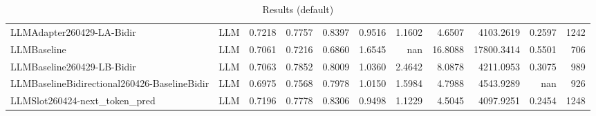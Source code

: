\begin{table}[htbp]
{\begin{tabular}{ll|rrrrrrrr|r}
LLMAdapter260429-LA-Bidir & LLM & 0.7218 & 0.7757 & 0.8397 & 0.9516 & 1.1602 & 4.6507 & 4103.2619 & 0.2597 & 1242 \\
LLMBaseline & LLM & 0.7061 & 0.7216 & 0.6860 & 1.6545 & nan & 16.8088 & 17800.3414 & 0.5501 & 706 \\
LLMBaseline260429-LB-Bidir & LLM & 0.7063 & 0.7852 & 0.8009 & 1.0360 & 2.4642 & 8.0878 & 4211.0953 & 0.3075 & 989 \\
LLMBaselineBidirectional260426-BaselineBidir & LLM & 0.6975 & 0.7568 & 0.7978 & 1.0150 & 1.5984 & 4.7988 & 4543.9289 & nan & 926 \\
LLMSlot260424-next\_token\_pred & LLM & 0.7196 & 0.7778 & 0.8306 & 0.9498 & 1.1229 & 4.5045 & 4097.9251 & 0.2454 & 1248 \\
\bottomrule
\end{tabular}
}
\caption{Results (default)}
\label{tab:results_default}
\end{table}